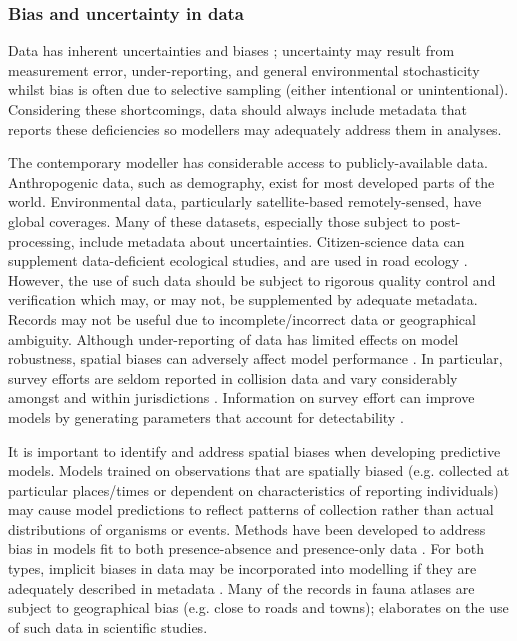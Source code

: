 \subsubsection{Bias and uncertainty in data}

Data has inherent uncertainties and biases \citep{glym97}; uncertainty may result from measurement error, under-reporting, and general environmental stochasticity whilst bias is often due to selective sampling (either intentional or unintentional). Considering these shortcomings, data should always include metadata that reports these deficiencies so modellers may adequately address them in analyses.

The contemporary modeller has considerable access to publicly-available data. Anthropogenic data, such as demography, exist for most developed parts of the world. Environmental data, particularly satellite-based remotely-sensed, have global coverages. Many of these datasets, especially those subject to post-processing, include metadata about uncertainties. Citizen-science data can supplement data-deficient ecological studies, and are used in road ecology \citep{paul14}. However, the use of such data should be subject to rigorous quality control and verification which may, or may not, be supplemented by adequate metadata. Records may not be useful due to incomplete/incorrect data or geographical ambiguity. Although under-reporting of data has limited effects on model robustness, spatial biases can adversely affect model performance \citep{snow15}. In particular, survey efforts are seldom reported in collision data and vary considerably amongst and within jurisdictions \citep{huij07a}. Information on survey effort can improve models by generating parameters that account for detectability \citep{dora14}.

It is important to identify and address spatial biases when developing predictive models. Models trained on observations that are spatially biased (e.g. collected at particular places/times or dependent on characteristics of reporting individuals) may cause model predictions to reflect patterns of collection rather than actual distributions of organisms or events. Methods have been developed to address bias in models fit to both presence-absence \citep{hijm12} and presence-only data \citep{kram13}. For both types, implicit biases in data may be incorporated into modelling if they are adequately described in metadata \citep{wart13}. Many of the records in fauna atlases are subject to geographical bias (e.g. close to roads and towns); \cite{grah04} elaborates on the use of such data in scientific studies.

